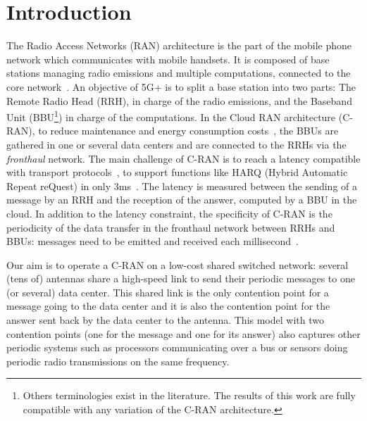 \documentclass[pdflatex,sn-mathphys,iicol]{sn-jnl}%
\theoremstyle{thmstyleone}%
\theoremstyle{thmstyletwo}%
\theoremstyle{thmstylethree}%
\begin{document}



\maketitle

\section{Introduction}

The Radio Access Networks (RAN) architecture is the part of the mobile phone network which communicates with mobile handsets. It is composed of base stations managing radio emissions and multiple computations, connected to the core network~\cite{bouguen2012lte}. 
An objective of 5G+ is to split a base station into two parts: The Remote Radio Head (RRH), in charge of the radio emissions, and the Baseband Unit (BBU\footnote{Others terminologies exist in the literature. The results of this work are fully compatible with any variation of the C-RAN architecture.}) in charge of the computations. In the Cloud RAN architecture (C-RAN), to reduce maintenance and energy consumption costs~\cite{gavrilovska2020cloud,mobile2011c,checko2014cloud}, the BBUs are gathered in one or several data centers and are connected to the RRHs via the \emph{fronthaul} network.
 The main challenge of C-RAN is to reach a latency compatible with transport protocols~\cite{ieeep802}, to support functions like  HARQ (Hybrid Automatic Repeat reQuest) in only $3$ms~\cite{bouguen2012lte}. The latency is measured between the sending of a message by an RRH and the reception of the answer, computed by a BBU in the cloud. In addition to the latency constraint, the specificity of C-RAN is the periodicity of the data transfer in the fronthaul network between RRHs and BBUs: messages need to be emitted and received each millisecond~\cite{dogra2020survey,3gpp5g,romano2019imt}.

Our aim is to operate a C-RAN on a low-cost shared switched network: several (tens of) antennas share a high-speed link to send their periodic messages to one (or several) data center. This shared link is the only contention point for a message going to the data center and it is also the contention point for the answer sent back by the data center to the antenna. This model with two contention points (one for the message and one for its answer) also captures other periodic systems such as processors communicating over a bus or sensors doing periodic radio transmissions on the same frequency.
\end{document}
